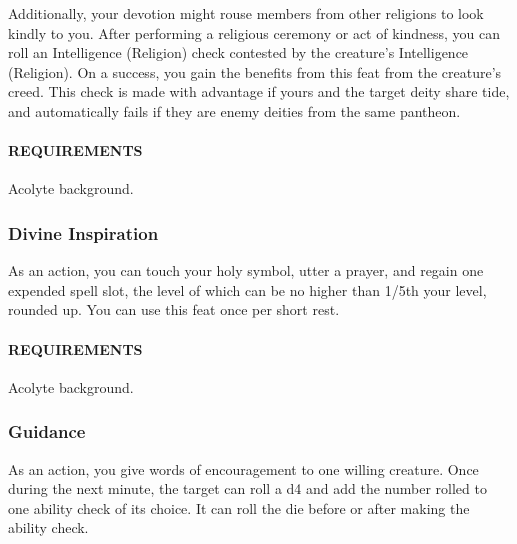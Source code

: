         Additionally, your devotion might rouse members from other religions to look kindly to you.
        After performing a religious ceremony or act of kindness, you can roll an Intelligence (Religion) check contested by the creature's Intelligence (Religion).
        On a success, you gain the benefits from this feat from the creature's creed.
        This check is made with advantage if yours and the target deity share tide, and automatically fails if they are enemy deities from the same pantheon.

        \paragraph{REQUIREMENTS} Acolyte background.

    \subsubsection{Divine Inspiration} \label{feat::divineinspiration}
        As an action, you can touch your holy symbol, utter a prayer, and regain one expended spell slot, the level of which can be no higher than 1/5th your level, rounded up.
        You can use this feat once per short rest.
        \paragraph{REQUIREMENTS} Acolyte background.

    \subsubsection{Guidance} \label{feat::guidance}
        As an action, you give words of encouragement to one willing creature.
        Once during the next minute, the target can roll a d4 and add the number rolled to one ability check of its choice.
        It can roll the die before or after making the ability check.

